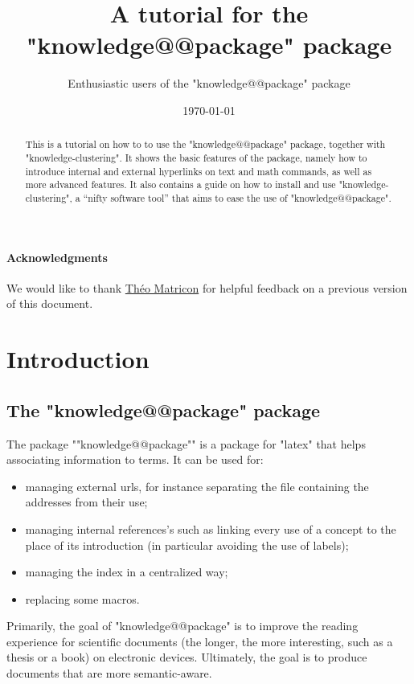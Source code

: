 \documentclass{article}
\title{A tutorial for the "knowledge@@package" package}
\author{Enthusiastic users of the "knowledge@@package" package}
\date{\today}
\begin{document}
\maketitle

\begin{abstract}
    This is a tutorial on how to to use the 
    "knowledge@@package" package, together with "knowledge-clustering".
    It shows the basic features of the package, namely how 
    to introduce internal and external hyperlinks on text and math commands,
    as well as more advanced features.
    It also contains a guide on how to install and use "knowledge-clustering", 
    a ``nifty software tool'' that aims to ease the use of "knowledge@@package".
\end{abstract}

\tableofcontents

\paragraph{Acknowledgments} We would like to thank
\href{http://www.matricon.ninja/}{Théo Matricon} for helpful feedback
on a previous version of this document.


\section{Introduction}

\subsection{The "knowledge@@package" package}

The package \AP""knowledge@@package"" is a package for "latex" that helps associating 
information to terms. It can be used for:
\begin{itemize}
    \item managing external urls, for instance separating the file containing   
        the addresses from their use;
    \item managing internal references's such as linking every use of a concept 
        to the place of its introduction
        (in particular avoiding the use of labels);
    \item managing the index in a centralized way;
    \item replacing some macros.
\end{itemize}

Primarily, the goal of "knowledge@@package" is to improve the reading experience for scientific documents (the longer, the more interesting, such as a thesis or a book) on electronic devices. Ultimately, the goal is to produce documents that are more semantic-aware.
\end{document}
